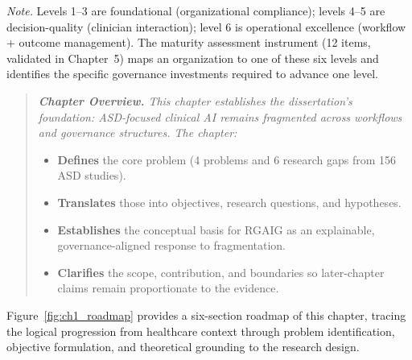 \vspace{0.4em}
\noindent\textit{Note.} Levels 1--3 are foundational (organizational compliance); levels 4--5 are decision-quality (clinician interaction); level 6 is operational excellence (workflow + outcome management). The maturity assessment instrument (12 items, validated in Chapter~5) maps an organization to one of these six levels and identifies the specific governance investments required to advance one level.
\renewcommand{\tabfixsetup}{\sloppy\sloppy\hyphenpenalty=0\exhyphenpenalty=0\tolerance=9999\emergencystretch=8em\hfuzz=100pt\hbadness=9999}

\label{sec:primary_data_instruments}
\label{sec:secondary_data_instruments}
\label{sec:conceptual_model}
\label{fig:conceptual_model}
\label{tab:research_blueprint}
\label{tab:literature_comparison}

\vspace{0.3em}

\noindent\begin{quote}\itshape\small
\textbf{\color{currentaccent}Chapter Overview.}
This chapter establishes the dissertation's foundation: ASD-focused clinical AI remains fragmented across workflows and governance structures. The chapter:
\begin{itemize}[leftmargin=*, itemsep=2pt]
    \item \textbf{Defines} the core problem (4 problems and 6 research gaps from 156 ASD studies).
    \item \textbf{Translates} those into objectives, research questions, and hypotheses.
    \item \textbf{Establishes} the conceptual basis for RGAIG as an explainable, governance-aligned response to fragmentation.
    \item \textbf{Clarifies} the scope, contribution, and boundaries so later-chapter claims remain proportionate to the evidence.
\end{itemize}
\end{quote}
\vspace{0.5em}


\noindent Figure~\ref{fig:ch1_roadmap} provides a six-section roadmap of this chapter, tracing the logical progression from healthcare context through problem identification, objective formulation, and theoretical grounding to the research design.



